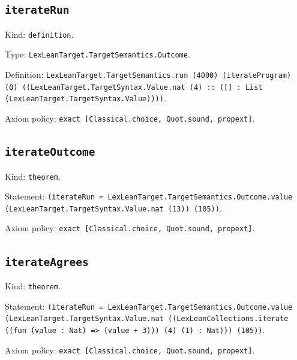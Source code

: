 \documentclass[11pt]{article}
\begin{document}
\subsection*{\texttt{iterateRun}}
\noindent Kind: \texttt{definition}.\par
\noindent Type: \texttt{LexLeanTarget.TargetSemantics.Outcome}.\par
\noindent Definition: \texttt{LexLeanTarget.TargetSemantics.run (4000) (iterateProgram) (0) ((LexLeanTarget.TargetSyntax.Value.nat (4) :: ([] : List (LexLeanTarget.TargetSyntax.Value))))}.\par
\noindent Axiom policy: \texttt{exact [Classical.choice, Quot.sound, propext]}.\par
\subsection*{\texttt{iterateOutcome}}
\noindent Kind: \texttt{theorem}.\par
\noindent Statement: \texttt{(iterateRun = LexLeanTarget.TargetSemantics.Outcome.value (LexLeanTarget.TargetSyntax.Value.nat (13)) (105))}.\par
\noindent Axiom policy: \texttt{exact [Classical.choice, Quot.sound, propext]}.\par
\subsection*{\texttt{iterateAgrees}}
\noindent Kind: \texttt{theorem}.\par
\noindent Statement: \texttt{(iterateRun = LexLeanTarget.TargetSemantics.Outcome.value (LexLeanTarget.TargetSyntax.Value.nat ((LexLeanCollections.iterate ((fun (value : Nat) => (value + 3))) (4) (1) : Nat))) (105))}.\par
\noindent Axiom policy: \texttt{exact [Classical.choice, Quot.sound, propext]}.\par
\end{document}
